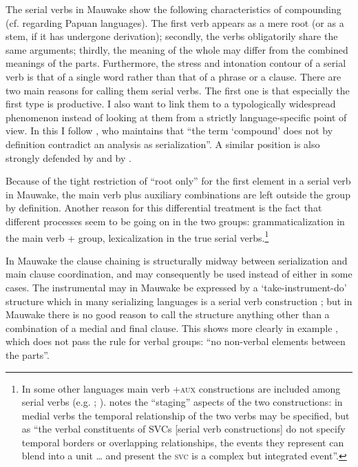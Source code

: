 The serial verbs in Mauwake show the following characteristics of compounding (cf. \citealt[69]{James1983} regarding Papuan languages). The first verb appears as a mere root (or as a stem, if it has undergone derivation); secondly, the verbs obligatorily share the same arguments; thirdly, the meaning of the whole may differ from the combined meanings of the parts. Furthermore, the stress and intonation contour of a serial verb is that of a single word rather than that of a phrase or a clause. There are two main reasons for calling them serial verbs. The first one is that especially the first type is productive. I also want to link them to a typologically widespread phenomenon instead of looking at them from a strictly language-specific point of view. In this I follow \citet[101]{Margetts1999}, who maintains that ``{the term `compound' does not by definition contradict an analysis as serialization}''. A similar position is also strongly defended by \citet[16]{Crowley2002} and by \citet[17]{Givon1991}.

Because of the tight restriction of ``root only'' for the first element in a serial verb in Mauwake, the main verb plus auxiliary combinations are left outside the group by definition. Another reason for this differential treatment is the fact that different processes seem to be going on in the two groups: grammaticalization in the main verb +  group, lexicalization in the true serial verbs.\footnote{In some other languages main verb +\textsc{aux} constructions are included among serial verbs (e.g. \citealt[29]{James1983}; \citealt[178]{Crowley2002}). \citet[174]{Farr1999} notes the ``staging'' aspects of the two constructions: in medial verbs the temporal relationship of the two verbs may be specified, but as ``the verbal constituents of SVCs [serial verb constructions] do not specify temporal borders or overlapping relationships, the events they represent can blend into a unit {\dots} and present the \textsc{svc} is a complex but integrated event''.} 

In Mauwake the clause chaining is structurally midway between serialization and main clause coordination, and may consequently be used instead of either in some cases. The instrumental may in Mauwake be expressed by a `take-instrument-do' structure  which in many serializing languages is a serial verb construction \citep[162--74]{Sebba1987}; but in Mauwake there is no good reason to call the structure anything other than a combination of a medial and final clause. This shows more clearly in example , which does not pass the rule for verbal groups: ``no non-verbal elements between the parts''. 

